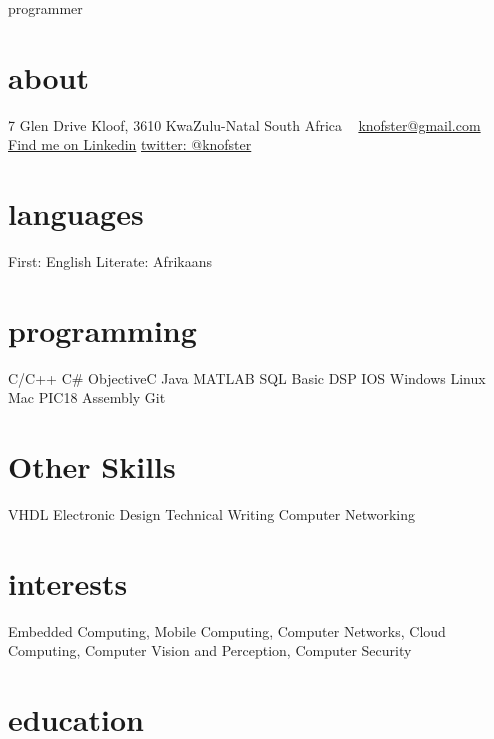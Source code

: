\documentclass[]{friggeri-cv}
\begin{document}
       {programmer}


\begin{aside}
  \section{about}
    7 Glen Drive
    Kloof, 3610
    KwaZulu-Natal
    South Africa 
    ~
    \href{mailto:knofster@gmail.com}{knofster@gmail.com}
    \href{http://za.linkedin.com/in/knofst}{Find me on Linkedin}
    \href{https://twitter.com/knofster}{twitter: @knofster}
  \section{languages}
    First: English
    Literate: Afrikaans
  \section{programming}
    C/C++
    C\#
    ObjectiveC
    Java
    MATLAB
    SQL
   	Basic DSP
   	IOS
   	Windows
   	Linux
   	Mac
   	PIC18 Assembly
   	Git
  \section{Other Skills}
  	VHDL
  	Electronic Design
  	Technical Writing
  	Computer Networking
    
\end{aside}

\section{interests}

Embedded Computing, Mobile Computing, Computer Networks, Cloud Computing, Computer Vision and Perception, Computer Security 

\section{education}
\end{document}
